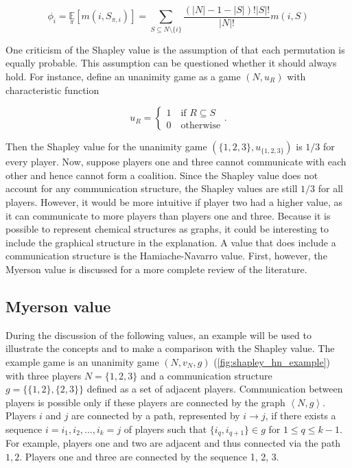\begin{equation}
    \label{eq:Shapley}
    \phi_i = \underset{\pi}{\mathbb{E}} \left[ m\left(i, S_{\pi, i} \right) \right]
	= \sum_{S \subseteq N \setminus \{i\}} \frac{\left(|N| - 1 - |S|\right)!|S|!}{|N|!} m(i, S)
\end{equation}


One criticism of the Shapley value is the assumption of that each permutation 
is equally probable. This assumption can be questioned whether it should always hold. For instance, 
define an unanimity game as a game $(N, u_R)$ with characteristic function


\begin{equation}
	u_R = \begin{cases}
		1 \quad \text{if } R \subseteq S \\
		0 \quad \text{otherwise}
	\end{cases}.
\end{equation}


Then the Shapley value for the unanimity game $(\{1, 2, 3\}, u_{\{1,2,3\}})$ is $1/3$ for every player.\cite{hamiache_value_1999}
Now, suppose players one and three cannot communicate with each other and hence cannot form a coalition.
Since the Shapley value does not account for any communication structure, the Shapley values are still
$1/3$ for all players. However, it would be more intuitive if player two had a higher value, as it can
communicate to more players than players one and three. Because it is possible to represent chemical
structures as graphs, it could be interesting to include the graphical structure in the explanation. A
value that does include a communication structure is the Hamiache-Navarro value.
First, however, the Myerson value is discussed for a more complete review of the literature.
\cite{hamiache_value_1999, hamiache_associated_2020}


\subsection{Myerson value}


During the discussion of the following values, an example will be used to illustrate 
the concepts and to make a comparison with the Shapley value. 
The example game is an unanimity game $(N, v_N, g)$ (\cref{fig:shapley_hn_example}) 
with three players $N = \{1, 2, 3\}$ and a communication structure $g = \{\{1, 2\}, \{2, 3\}\}$ 
defined as a set of adjacent players.\cite{hamiache_associated_2020} Communication 
between players is possible only if these players are connected by the graph 
$\left<N, g\right>$. Players $i$ and $j$ are connected by a path, represented by $i \rightarrow j$, 
if there exists a sequence $i = i_1, i_2, \dots, i_k = j$ of players such 
that $\{i_q, i_{q+1}\} \in g$ for $1 \le q \le k - 1$. For example, 
players one and two are adjacent and thus connected via the path $1, 2$. 
Players one and three are connected by the sequence 1, 2, 3.\cite{hamiache_value_1999, hamiache_associated_2020} 



